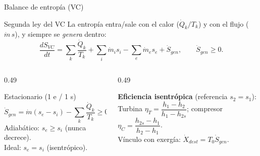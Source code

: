\documentclass[aspectratio=169,10pt]{beamer}
\begin{document}
\begin{frame}{Balance de entropía (VC)}
\begin{cardidea}{Segunda ley del VC}{\faRandom}
La entropía entra/sale con el calor ($\dot Q_k/T_k$) y con el flujo ($\dot m\,s$), y siempre se \emph{genera} dentro:
$$\frac{dS_{VC}}{dt}=\sum_k\frac{\dot Q_k}{T_k}+\sum_i\dot m_i s_i-\sum_e\dot m_e s_e+\dot S_{gen},\qquad \dot S_{gen}\ge0.$$
\end{cardidea}
\vspace{1.4mm}
\begin{columns}[T]
\begin{column}{0.49\textwidth}
\begin{cardgear}{Estacionario (1 e / 1 s)}{\faSuperscript}
{\footnotesize
$$\dot S_{gen}=\dot m(s_e-s_i)-\sum_k\frac{\dot Q_k}{T_k}\ge0.$$
Adiabático: $s_e\ge s_i$ (nunca decrece).\\[0.4mm]
Ideal: $s_e=s_i$ (isentrópico).}
\end{cardgear}
\end{column}
\begin{column}{0.49\textwidth}
\begin{cardnota}[\faInfoCircle]
\textbf{Eficiencia isentrópica} (referencia $s_2=s_1$):\\[0.6mm]
Turbina $\eta_T=\dfrac{h_1-h_2}{h_1-h_{2s}}$;\;
compresor $\eta_C=\dfrac{h_{2s}-h_1}{h_2-h_1}$.\\[0.6mm]
Vínculo con exergía: $\dot X_{dest}=T_0\dot S_{gen}$.
\end{cardnota}
\end{column}
\end{columns}
\end{frame}
\end{document}
